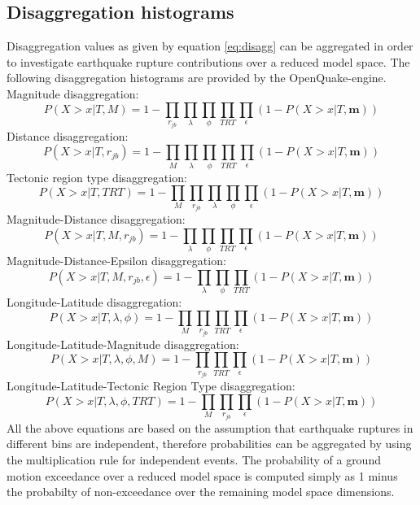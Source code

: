 \subsection{Disaggregation histograms}
Disaggregation values as given by equation \ref{eq:disagg} can be aggregated in order to investigate earthquake rupture
contributions over a reduced model space. The following disaggregation histograms are provided by the OpenQuake-engine.\\
Magnitude disaggregation:
\begin{equation}
P(X > x | T, M) = 1 -\prod_{r_{jb}}\prod_{\lambda}\prod_{\phi}\prod_{TRT} \prod_{\epsilon}(1 - P(X > x | T, \bm{m}))
\end{equation}
Distance disaggregation:
\begin{equation}
P(X > x | T, r_{jb}) = 1 -\prod_{M}\prod_{\lambda}\prod_{\phi}\prod_{TRT} \prod_{\epsilon}(1 - P(X > x | T, \bm{m}))
\end{equation}
Tectonic region type disaggregation:
\begin{equation}
P(X > x | T, TRT) = 1 -\prod_{M}\prod_{r_{jb}}\prod_{\lambda}\prod_{\phi} \prod_{\epsilon}(1 - P(X > x | T, \bm{m}))
\end{equation}
Magnitude-Distance disaggregation:
\begin{equation}
P(X > x | T, M, r_{jb}) = 1 -\prod_{\lambda}\prod_{\phi}\prod_{TRT}\prod_{\epsilon}(1 - P(X > x | T, \bm{m}))
\end{equation}
Magnitude-Distance-Epsilon disaggregation:
\begin{equation}
P(X > x | T, M, r_{jb}, \epsilon) = 1 -\prod_{\lambda}\prod_{\phi}\prod_{TRT}(1 - P(X > x | T, \bm{m}))
\end{equation}
Longitude-Latitude disaggregation:
\begin{equation}
P(X > x | T, \lambda, \phi) = 1 -\prod_{M}\prod_{r_{jb}}\prod_{TRT}\prod_{\epsilon}(1 - P(X > x | T, \bm{m}))
\end{equation}
Longitude-Latitude-Magnitude disaggregation:
\begin{equation}
P(X > x | T, \lambda, \phi, M) = 1 -\prod_{r_{jb}}\prod_{TRT}\prod_{\epsilon}(1 - P(X > x | T, \bm{m}))
\end{equation}
Longitude-Latitude-Tectonic Region Type disaggregation:
\begin{equation}
P(X > x | T, \lambda, \phi, TRT) = 1 -\prod_{M}\prod_{r_{jb}}\prod_{\epsilon}(1 - P(X > x | T, \bm{m}))
\end{equation}
All the above equations are based on the assumption that earthquake ruptures in different bins are independent, therefore
probabilities can be aggregated by using the multiplication rule for independent events. The probability of a ground motion
exceedance over a reduced model space is computed simply as 1 minus the probabilty of non-exceedance over the remaining
model space dimensions.

